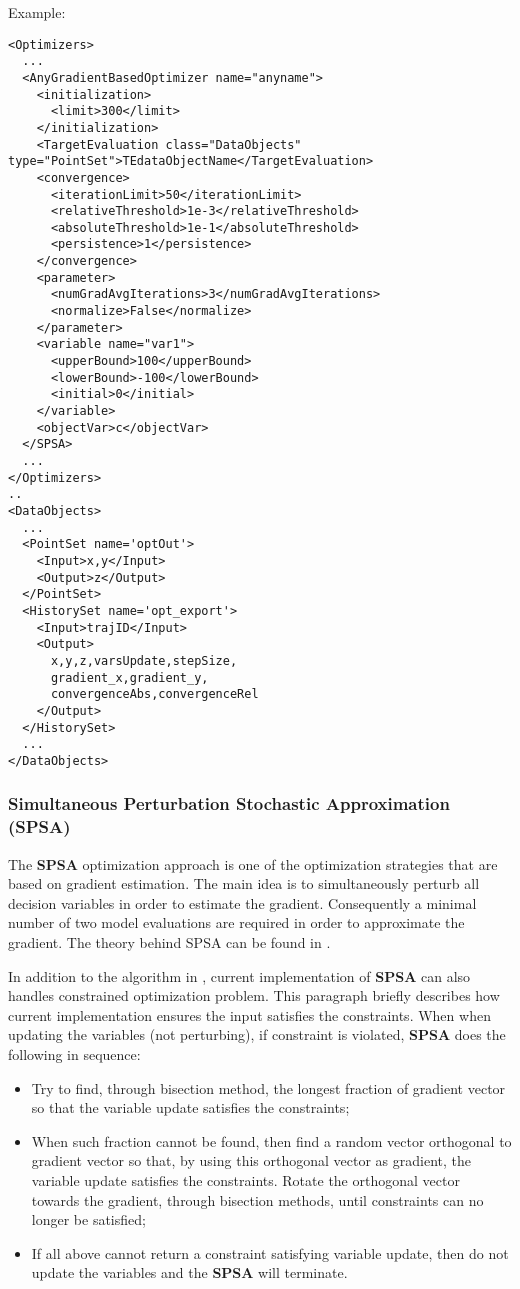 Example:
\begin{lstlisting}[style=XML]
<Optimizers>
  ...
  <AnyGradientBasedOptimizer name="anyname">
    <initialization>
      <limit>300</limit>
    </initialization>
    <TargetEvaluation class="DataObjects" type="PointSet">TEdataObjectName</TargetEvaluation>
    <convergence>
      <iterationLimit>50</iterationLimit>
      <relativeThreshold>1e-3</relativeThreshold>
      <absoluteThreshold>1e-1</absoluteThreshold>
      <persistence>1</persistence>
    </convergence>
    <parameter>
      <numGradAvgIterations>3</numGradAvgIterations>
      <normalize>False</normalize>
    </parameter>
    <variable name="var1">
      <upperBound>100</upperBound>
      <lowerBound>-100</lowerBound>
      <initial>0</initial>
    </variable>
    <objectVar>c</objectVar>
  </SPSA>
  ...
</Optimizers>
..
<DataObjects>
  ...
  <PointSet name='optOut'>
    <Input>x,y</Input>
    <Output>z</Output>
  </PointSet>
  <HistorySet name='opt_export'>
    <Input>trajID</Input>
    <Output>
      x,y,z,varsUpdate,stepSize,
      gradient_x,gradient_y,
      convergenceAbs,convergenceRel
    </Output>
  </HistorySet>
  ...
</DataObjects>
\end{lstlisting}

\subsubsection{Simultaneous Perturbation Stochastic Approximation (SPSA)}
\label{subsubsubsec:SPSA}
The \textbf{SPSA} optimization approach is one of the optimization strategies that are based on gradient estimation. The main
idea is to simultaneously perturb all decision variables in order to estimate the gradient. Consequently a minimal number of two
model evaluations are required in order to approximate the gradient. The theory behind SPSA can be found in
\cite{spall1998implementation}.

In addition to the algorithm in \cite{spall1998implementation}, current implementation of \textbf{SPSA} can also handles
constrained optimization problem. This paragraph briefly describes how current implementation ensures the input satisfies the
constraints. When when updating the variables (not perturbing), if constraint is violated, \textbf{SPSA} does the following in
sequence:
\begin{itemize}
\item Try to find, through bisection method, the longest fraction of gradient vector so that the variable update satisfies the
constraints;
\item When such fraction cannot be found, then find a random vector orthogonal to gradient vector so that, by using this
orthogonal vector as gradient, the variable update satisfies the constraints. Rotate the orthogonal vector towards the gradient,
through bisection methods, until constraints can no longer be satisfied;
\item If all above cannot return a constraint satisfying variable update, then do not update the variables and the \textbf{SPSA} will
terminate.
\end{itemize}

